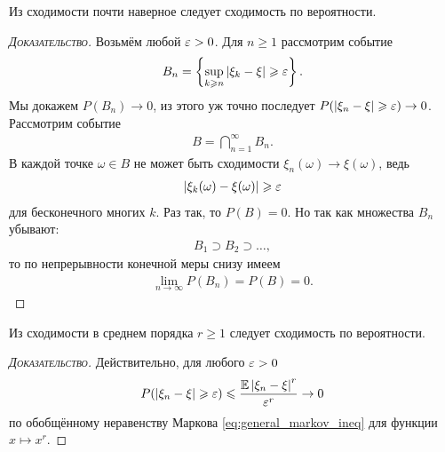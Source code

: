 \documentclass[../main.tex]{subfiles}
\begin{document}
\begin{prop}
 Из сходимости почти наверное следует сходимость по вероятности.
\end{prop}
\begin{proof}[\normalfont\textsc{Доказательство}]
 Возьмём любой $ \varepsilon > 0 $. Для $ n \geqslant 1 $ рассмотрим событие
 \begin{align*}
  B_n = \left\{ \sup_{k \geqslant n} \left| \xi_k - \xi \right| \geqslant \varepsilon \right\}.
 \end{align*} Мы докажем $ P(B_n) \to 0 $, из этого уж точно последует $ P(\left| \xi_n-\xi \right| \geqslant \varepsilon) \to 0 $. Рассмотрим событие
 \begin{align*}
  B = \bigcap_{n=1}^{\infty} B_n.
 \end{align*} В каждой точке $ \omega \in B $ не может быть сходимости $ \xi_n(\omega) \to \xi(\omega) $, ведь
 \begin{align*}
  \left| \xi_k(\omega) - \xi(\omega) \right| \geqslant \varepsilon
 \end{align*} для бесконечного многих $ k $. Раз так, то $ P(B) = 0 $. Но так как множества $ B_n $ убывают:
 \begin{align*}
  B_1 \supset B_2 \supset \ldots,
 \end{align*} то по непрерывности конечной меры снизу имеем
 \begin{align*}
  \lim_{n \to \infty} P(B_n) = P(B) = 0.
 \end{align*}
\end{proof}

\begin{prop}
 Из сходимости в среднем порядка $ r \geqslant 1 $ следует сходимость по вероятности.
\end{prop}
\begin{proof}[\normalfont\textsc{Доказательство}]
 Действительно, для любого $ \varepsilon > 0 $
  \begin{align*}
  P(\left| \xi_n-\xi \right| \geqslant \varepsilon) \leqslant \frac{\mathbb E \left| \xi_n - \xi \right|^{r}}{\varepsilon^{r}} \to 0
 \end{align*} по обобщённому неравенству Маркова \eqref{eq:general_markov_ineq} для функции $ x \mapsto x^{r} $.
\end{proof}
\end{document}
